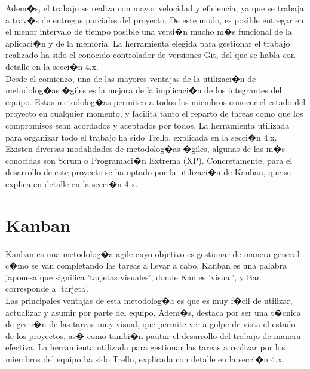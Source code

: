 Adem�s, el trabajo se realiza con mayor velocidad y eficiencia, ya que se trabaja a trav�s de entregas parciales del proyecto. De este  modo, es posible entregar en el menor intervalo de tiempo posible una versi�n mucho m�s funcional de la aplicaci�n y de la memoria. La herramienta elegida para gestionar el trabajo realizado ha sido el conocido controlador de versiones Git, del que se habla con detalle en la secci�n 4.x.\\


Desde el comienzo, una de las mayores ventajas de la utilizaci�n de metodolog�as �giles es la mejora de la implicaci�n de los integrantes del equipo. Estas metodolog�as permiten a todos los miembros conocer el estado del proyecto en cualquier momento, y facilita tanto el reparto de tareas como que los compromisos sean acordados y aceptados por todos. La herramienta utilizada para organizar todo el trabajo ha sido Trello, explicada en la secci�n 4.x.\\


Existen diversas modalidades de metodolog�as �giles, algunas de las m�s conocidas son Scrum o Programaci�n Extrema (XP). Concretamente, para el desarrollo de este proyecto se ha optado por la utilizaci�n de Kanban, que se explica en detalle en la secci�n 4.x.


\section{Kanban}
\label{cap4:sec:Kanban}

Kanban \citep*{tchKanban1} es una metodolog�a agile cuyo objetivo es gestionar de manera general c�mo se van completando las tareas a llevar a cabo. Kanban es una palabra japonesa que significa 'tarjetas visuales', donde Kan es 'visual', y Ban corresponde a 'tarjeta'.\\

Las principales ventajas de esta metodolog�a es que es muy f�cil de utilizar, actualizar y asumir por parte del equipo. Adem�s, destaca por ser una t�cnica de gesti�n de las tareas muy visual, que permite ver a golpe de vista el estado de los proyectos, as� como tambi�n pautar el desarrollo del trabajo de manera efectiva. La herramienta utilizada para gestionar las tareas a realizar por los miembros del equipo ha sido Trello, explicada con detalle en la secci�n 4.x.\\


